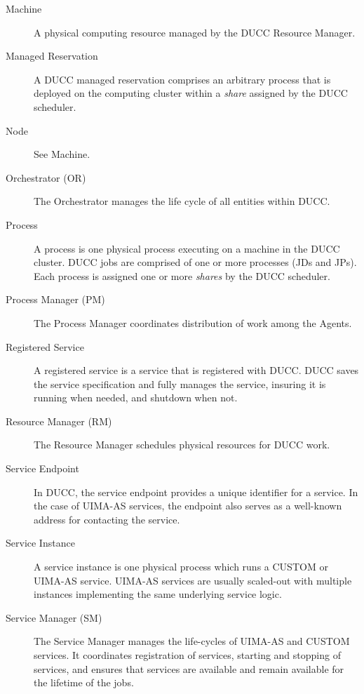 \begin{description}
\item[Machine] A physical computing resource managed by the DUCC Resource Manager.

\item[Managed Reservation] A DUCC managed reservation comprises an arbitrary process that is
  deployed on the computing cluster within a {\em share} assigned by the DUCC scheduler.

\item[Node] See Machine.

\item[Orchestrator (OR)] The Orchestrator manages the life cycle of all entities within DUCC.

\item[Process] A process is one physical process executing on a machine in the DUCC cluster. DUCC
  jobs are comprised of one or more processes (JDs and JPs).  Each process is assigned one or
  more {\em shares} by the DUCC scheduler.

\item[Process Manager (PM) ] The Process Manager coordinates distribution of work among the Agents.

\item[Registered Service] A registered service is a service that is registered with DUCC. DUCC
  saves the service specification and fully manages the service, insuring it is running when needed,
  and shutdown when not.

\item[Resource Manager (RM) ] The Resource Manager schedules physical resources for DUCC work.

\item[Service Endpoint] In DUCC, the service endpoint provides a unique identifier for a service. In
  the case of UIMA-AS services, the endpoint also serves as a well-known address for contacting the
  service. 

\item[Service Instance] A service instance is one physical process which runs a CUSTOM or UIMA-AS
  service.  UIMA-AS services are usually scaled-out with multiple instances implementing the
  same underlying service logic.

\item[Service Manager (SM)] The Service Manager manages the life-cycles of UIMA-AS and CUSTOM
  services. It coordinates registration of services, starting and stopping of services, and ensures
  that services are available and remain available for the lifetime of the jobs.


\end{description}
